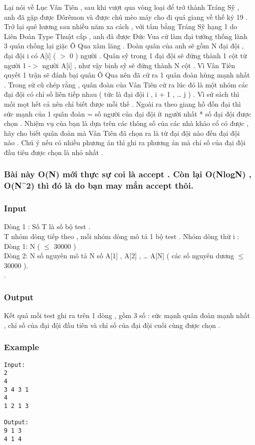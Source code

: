 



   Lại nói về Lục Vân Tiên , sau khi vượt qua vòng loại để trở thành Tráng Sỹ , anh đã gặp được Đôrêmon và được chú mèo máy cho đi quá giang về thế kỷ 19 . Trở lại quê hương sau nhiều năm xa cách , với tấm bằng Tráng Sỹ hạng 1 do Liên Đoàn Type Thuật cấp , anh đã được Đức Vua cử làm đại tướng thống lãnh 3 quân chống lại giặc Ô Qua xâm lăng . Đoàn quân của anh sẽ gồm N đại đội , đại đội i có A[i] ( $>$ 0 ) người . Quân sỹ trong 1 đại đội sẽ đứng thành 1 cột từ người 1 -$>$ người A[i] , như vậy binh sỹ sẽ đứng thành N cột . Vì Vân Tiên quyết 1 trận sẽ đánh bại quân Ô Qua nên đã cử ra 1 quân đoàn hùng mạnh nhất . Trong sử cũ chép rằng , quân đoàn của Vân Tiên cử ra lúc đó là một nhóm các đại đội có chỉ số liên tiếp nhau ( tức là đại đội i , i + 1 , … j ) . Vì sử sách thì mối mọt hết cả nên chỉ biết được mỗi thế . Ngoài ra theo giang hồ đồn đại thì sức mạnh của 1 quân đoàn = số người của đại đội ít người nhất * số đại đội được chọn . Nhiệm vụ của bạn là dựa trên các thông số của các nhà khảo cổ có được , hãy cho biết quân đoàn mà Vân Tiên đã chọn ra là từ đại đội nào đến đại đội nào . Chú ý nếu có nhiều phương án thì ghi ra phương án mà chỉ số của đại đội đầu tiên được chọn là nhỏ nhất .  

\subsubsection{   Bài này O(N) mới thực sự coi là accept . Còn lại O(NlogN) , O(N^2) thì đó là do bạn may mắn accept thôi.  }

\subsubsection{   Input  }

   Dòng 1 : Số T là số bộ test .   
\\   T nhóm dòng tiếp theo , mỗi nhóm dòng mô tả 1 bộ test . Nhóm dòng thứ i :   
\\   Dòng 1: N (  $\le$  30000 )   
\\   Dòng 2: N số nguyên mô tả N số A[1] , A[2] , … A[N] ( các số nguyên dương  $\le$  30000 ).   
\\   .  

\subsubsection{   Output  }

   Kết quả mỗi test ghi ra trên 1 dòng , gồm 3 số : sức mạnh quân đoàn mạnh nhất , chỉ số của đại đội đầu tiên và chỉ số của đại đội cuối cùng được chọn .  

\subsubsection{   Example  }
\begin{verbatim}
Input:
2
4
3 4 3 1
4
1 2 1 3

Output:
9 1 3
4 1 4
\end{verbatim}
